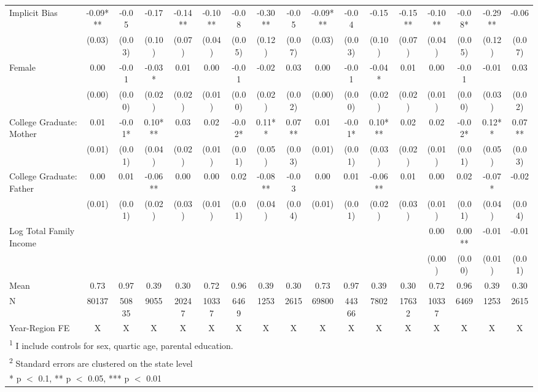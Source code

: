 \begin{landscape}
\begin{table}[!h]
{\begin{tabular}[t]{lcccccccccccccccc}
\midrule
Implicit Bias & -0.09*** & -0.05 & -0.17 & -0.14** & -0.10** & -0.08 & -0.30** & -0.05 & -0.09*** & -0.04 & -0.15 & -0.15** & -0.10** & -0.08* & -0.29** & -0.06\\
 & (0.03) & (0.03) & (0.10) & (0.07) & (0.04) & (0.05) & (0.12) & (0.07) & (0.03) & (0.03) & (0.10) & (0.07) & (0.04) & (0.05) & (0.12) & (0.07)\\
Female & 0.00 & -0.01 & -0.03* & 0.01 & 0.00 & -0.01 & -0.02 & 0.03 & 0.00 & -0.01 & -0.04* & 0.01 & 0.00 & -0.01 & -0.01 & 0.03\\
 & (0.00) & (0.00) & (0.02) & (0.02) & (0.01) & (0.00) & (0.02) & (0.02) & (0.00) & (0.00) & (0.02) & (0.02) & (0.01) & (0.00) & (0.03) & (0.02)\\
College Graduate: Mother & 0.01 & -0.01* & 0.10*** & 0.03 & 0.02 & -0.02* & 0.11** & 0.07** & 0.01 & -0.01* & 0.10*** & 0.02 & 0.02 & -0.02* & 0.12** & 0.07**\\
 & (0.01) & (0.01) & (0.04) & (0.02) & (0.01) & (0.01) & (0.05) & (0.03) & (0.01) & (0.01) & (0.03) & (0.02) & (0.01) & (0.01) & (0.05) & (0.03)\\
College Graduate: Father & 0.00 & 0.01 & -0.06** & 0.00 & 0.00 & 0.02 & -0.08** & -0.03 & 0.00 & 0.01 & -0.06** & 0.01 & 0.00 & 0.02 & -0.07* & -0.02\\
 & (0.01) & (0.01) & (0.02) & (0.03) & (0.01) & (0.01) & (0.04) & (0.04) & (0.01) & (0.01) & (0.02) & (0.03) & (0.01) & (0.01) & (0.04) & (0.04)\\
Log Total Family Income &  &  &  &  &  &  &  &  &  &  &  &  & 0.00 & 0.00** & -0.01 & -0.01\\
 &  &  &  &  &  &  &  &  &  &  &  &  & (0.00) & (0.00) & (0.01) & (0.01)\\
\midrule
Mean & 0.73 & 0.97 & 0.39 & 0.30 & 0.72 & 0.96 & 0.39 & 0.30 & 0.73 & 0.97 & 0.39 & 0.30 & 0.72 & 0.96 & 0.39 & 0.30\\
N & 80137 & 50835 & 9055 & 20247 & 10337 & 6469 & 1253 & 2615 & 69800 & 44366 & 7802 & 17632 & 10337 & 6469 & 1253 & 2615\\
Year-Region FE & X & X & X & X & X & X & X & X & X & X & X & X & X & X & X & X\\
\bottomrule
\multicolumn{17}{l}{\rule{0pt}{1em}\textsuperscript{1} I include controls for sex, quartic age, parental education.}\\
\multicolumn{17}{l}{\rule{0pt}{1em}\textsuperscript{2} Standard errors are clustered on the state level}\\
\multicolumn{17}{l}{\rule{0pt}{1em}* p $<$ 0.1, ** p $<$ 0.05, *** p $<$ 0.01}\\
\end{tabular}}
\end{table}
\end{landscape}
